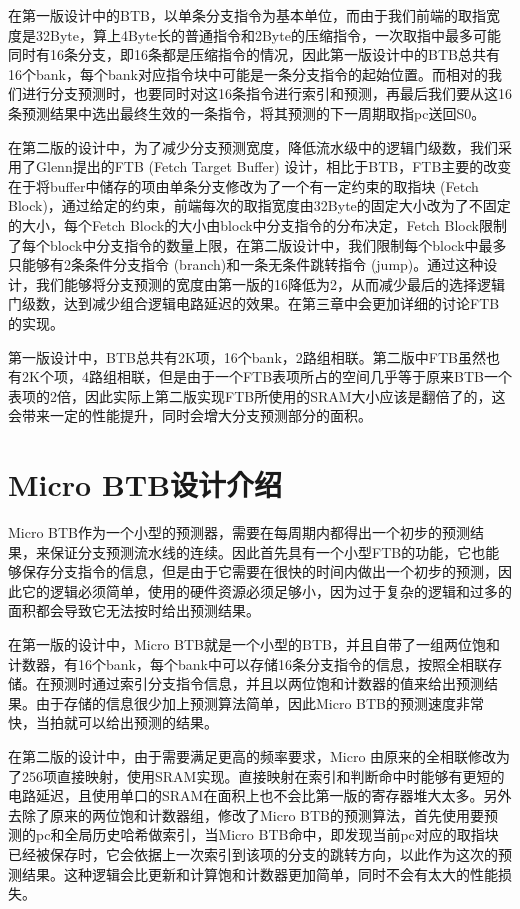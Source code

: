 在第一版设计中的BTB，以单条分支指令为基本单位，而由于我们前端的取指宽度是32Byte，算上4Byte长的普通指令和2Byte的压缩指令，一次取指中最多可能同时有16条分支，即16条都是压缩指令的情况，因此第一版设计中的BTB总共有16个bank，每个bank对应指令块中可能是一条分支指令的起始位置。而相对的我们进行分支预测时，也要同时对这16条指令进行索引和预测，再最后我们要从这16条预测结果中选出最终生效的一条指令，将其预测的下一周期取指pc送回S0。

在第二版的设计中，为了减少分支预测宽度，降低流水级中的逻辑门级数，我们采用了Glenn提出的FTB (Fetch Target Buffer) 设计\cite{scalable-frontend}，相比于BTB，FTB主要的改变在于将buffer中储存的项由单条分支修改为了一个有一定约束的取指块 (Fetch Block)，通过给定的约束，前端每次的取指宽度由32Byte的固定大小改为了不固定的大小，每个Fetch Block的大小由block中分支指令的分布决定，Fetch Block限制了每个block中分支指令的数量上限，在第二版设计中，我们限制每个block中最多只能够有2条条件分支指令 (branch)和一条无条件跳转指令 (jump)。通过这种设计，我们能够将分支预测的宽度由第一版的16降低为2，从而减少最后的选择逻辑门级数，达到减少组合逻辑电路延迟的效果。在第三章中会更加详细的讨论FTB的实现。

第一版设计中，BTB总共有2K项，16个bank，2路组相联。第二版中FTB虽然也有2K个项，4路组相联，但是由于一个FTB表项所占的空间几乎等于原来BTB一个表项的2倍，因此实际上第二版实现FTB所使用的SRAM大小应该是翻倍了的，这会带来一定的性能提升，同时会增大分支预测部分的面积。

\section{Micro BTB设计介绍}

Micro BTB作为一个小型的预测器，需要在每周期内都得出一个初步的预测结果，来保证分支预测流水线的连续。因此首先具有一个小型FTB的功能，它也能够保存分支指令的信息，但是由于它需要在很快的时间内做出一个初步的预测，因此它的逻辑必须简单，使用的硬件资源必须足够小，因为过于复杂的逻辑和过多的面积都会导致它无法按时给出预测结果。

在第一版的设计中，Micro BTB就是一个小型的BTB，并且自带了一组两位饱和计数器，有16个bank，每个bank中可以存储16条分支指令的信息，按照全相联存储。在预测时通过索引分支指令信息，并且以两位饱和计数器的值来给出预测结果。由于存储的信息很少加上预测算法简单，因此Micro BTB的预测速度非常快，当拍就可以给出预测的结果。

在第二版的设计中，由于需要满足更高的频率要求，Micro 由原来的全相联修改为了256项直接映射，使用SRAM实现。直接映射在索引和判断命中时能够有更短的电路延迟，且使用单口的SRAM在面积上也不会比第一版的寄存器堆大太多。另外去除了原来的两位饱和计数器组，修改了Micro BTB的预测算法，首先使用要预测的pc和全局历史哈希做索引，当Micro BTB命中，即发现当前pc对应的取指块已经被保存时，它会依据上一次索引到该项的分支的跳转方向，以此作为这次的预测结果。这种逻辑会比更新和计算饱和计数器更加简单，同时不会有太大的性能损失。

